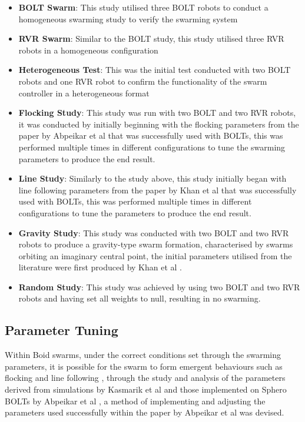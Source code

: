 \documentclass[conference]{IEEEtran}
\begin{document}
\begin{itemize}

\item \textbf{BOLT Swarm}: This study utilised three BOLT robots to conduct a homogeneous swarming study to verify the swarming system

\item \textbf{RVR Swarm}: Similar to the BOLT study, this study utilised three RVR robots in a homogeneous configuration

\item \textbf{Heterogeneous Test}: This was the initial test conducted with two BOLT robots and one RVR robot to confirm the functionality of the swarm controller in a heterogeneous format

\item \textbf{Flocking Study}: This study was run with two BOLT and two RVR robots, it was conducted by initially beginning with the flocking parameters from the paper by Abpeikar et al \cite{abpeikar_iterative_2023} that was successfully used with BOLTs, this was performed multiple times in different configurations to tune the swarming parameters to produce the end result.

\item \textbf{Line Study}: Similarly to the study above, this study initially began with line following parameters from the paper by Khan et al \cite{khan_autonomous_2020} that was successfully used with BOLTs, this was performed multiple times in different configurations to tune the parameters to produce the end result.

\item \textbf{Gravity Study}: This study was conducted with two BOLT and two RVR robots to produce a gravity-type swarm formation, characterised by swarms orbiting an imaginary central point, the initial parameters utilised from the literature were first produced by Khan et al \cite{khan_autonomous_2020}.

\item \textbf{Random Study}: This study was achieved by using two BOLT and two RVR robots and having set all weights to null, resulting in no swarming.

\end{itemize}

\subsection{Parameter Tuning}
Within Boid swarms, under the correct conditions set through the swarming parameters, it is possible for the swarm to form emergent behaviours such as flocking and line following \cite{kasmarik_autonomous_2020}, through the study and analysis of the parameters derived from simulations by Kasmarik et al \cite{kasmarik_autonomous_2020} and those implemented on Sphero BOLTs by Abpeikar et al \cite{abpeikar_automatic_2022}, a method of implementing and adjusting the parameters used successfully within the paper by Abpeikar et al \cite{abpeikar_automatic_2022} was devised.  
\end{document}
